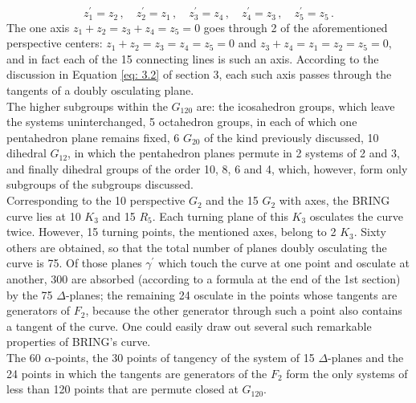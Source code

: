 \documentclass[leqno]{article}
\begin{document}
\[
z_1^\prime = z_2 \, , \quad z_2^\prime = z_1 \, , \quad z_3^\prime = z_4 \, , \quad z_4^\prime = z_3 \, , \quad z_5^\prime = z_5 \, . 
\]
The one axis $z_1 + z_2 = z_3 + z_4 = z_5 = 0$ goes through 2 of the aforementioned perspective centers: $z_1 +z_2 = z_3 = z_4 = z_5 = 0$ and $z_3 + z_4 = z_1 = z_2 = z_5=0$, and in fact each of the 15 connecting lines is such an axis. According to the discussion in Equation \eqref{eq: 3.2} of section 3, each such axis passes through the tangents of a doubly osculating plane. \\
The higher subgroups within the $G_{120}$ are: the icosahedron groups, which leave the systems uninterchanged, 5 octahedron groups, in each of which one pentahedron plane remains fixed, 6 $G_{20}$ of the kind previously discussed, 10 dihedral $G_{ 12}$, in which the pentahedron planes permute in 2 systems of 2 and 3, and finally dihedral groups of the order 10, 8, 6 and 4, which, however, form only subgroups of the subgroups discussed. \\
Corresponding to the 10 perspective $G_2$ and the 15 $G_2$ \guillemotright with axes\guillemotright, the BRING curve lies at 10 $K_3$ and 15 $R_5$. Each turning plane of this $K_3$ osculates the curve twice. However, 15 turning points, the mentioned axes, belong to 2 $K_3$. Sixty others are obtained, so that the total number of planes doubly osculating the curve is 75. Of those planes $\gamma^\prime$ which touch the curve at one point and osculate at another, 300 are absorbed (according to a formula at the end of the 1st section) by the 75 $\Delta$-planes; the remaining 24 osculate in the points whose tangents are generators of $F_2$, because the other generator through such a point also contains a tangent of the curve. One could easily draw out several such remarkable properties of BRING's curve. \\
The 60 $\alpha$-points, the 30 points of tangency of the system of 15 $\Delta$-planes and the 24 points in which the tangents are generators of the $F_2$ form the only systems of less than 120 points that are permute closed at $G_{120}$.
\end{document}
